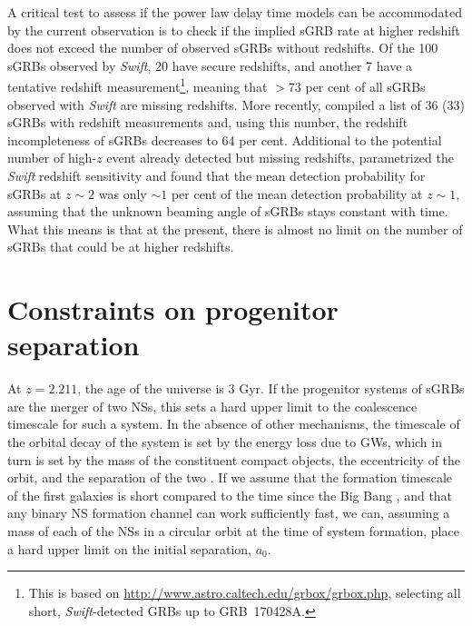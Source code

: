 \documentclass{aa}    %
\begin{document}
A critical test to assess if the power law delay time models can be accommodated
by the current observation is to check if the implied sGRB rate at higher
redshift does not exceed the number of observed sGRBs without redshifts. Of the
100  sGRBs observed by \textit{Swift}, 20 have secure redshifts, and another 7
have a tentative redshift measurement\footnote{This is based on
	\url{http://www.astro.caltech.edu/grbox/grbox.php}, selecting all short,
	\textit{Swift}-detected GRBs up to GRB~170428A.}, meaning that $> 73$ per cent of all
sGRBs observed with \textit{Swift} are missing redshifts. More recently,
\citet{Fong2017} \citep{LIGOScientificCollaboration2017b} compiled a list of 36
(33) sGRBs with redshift measurements and, using this number, the redshift
incompleteness of sGRBs decreases to 64 per cent. Additional to the potential
number of high-$z$ event already detected but missing redshifts,
\citet{Behroozi2014} parametrized the \textit{Swift} redshift sensitivity and
found that the mean detection probability for sGRBs at $z \sim2$ was only $\sim1$
per cent of the mean detection probability at $z \sim1$, assuming that the
unknown beaming angle of sGRBs stays constant with time. What this means is that
at the present, there is almost no limit on the number of sGRBs that could be at
higher redshifts.

\section{Constraints on progenitor separation}

At $z = 2.211$, the age of the universe is 3 Gyr. If the progenitor systems of
sGRBs are the merger of two NSs, this sets a hard upper limit to the coalescence
timescale for such a system. In the absence of other mechanisms, the timescale
of the orbital decay of the system is set by the energy loss due to
GWs, which in turn is set by the mass of the constituent compact
objects, the eccentricity of the orbit, and the separation of the two
\citep{Postnov2014}. If we assume that the formation timescale of the first
galaxies is short compared to the time since the Big Bang \citep{Richard2011},
and that any binary NS formation channel can work sufficiently fast,
we can, assuming a mass of each of the NSs in a circular orbit at the time of
system formation, place a hard upper limit on the initial separation, $a_0$.
\end{document}
